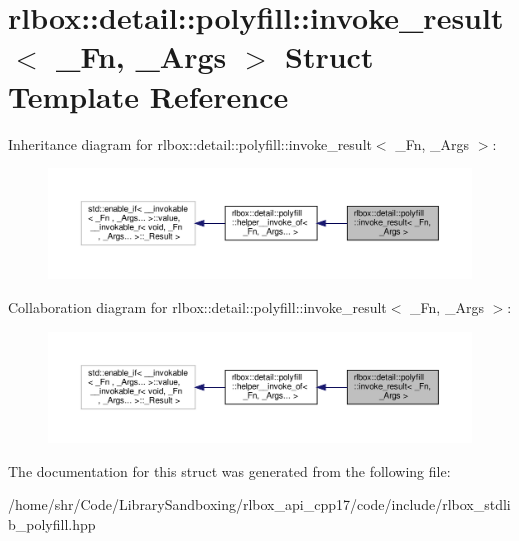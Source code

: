 \hypertarget{structrlbox_1_1detail_1_1polyfill_1_1invoke__result}{}\section{rlbox\+:\+:detail\+:\+:polyfill\+:\+:invoke\+\_\+result$<$ \+\_\+\+Fn, \+\_\+\+Args $>$ Struct Template Reference}
\label{structrlbox_1_1detail_1_1polyfill_1_1invoke__result}


Inheritance diagram for rlbox\+:\+:detail\+:\+:polyfill\+:\+:invoke\+\_\+result$<$ \+\_\+\+Fn, \+\_\+\+Args $>$\+:\nopagebreak
\begin{figure}[H]
\begin{center}
\leavevmode
\includegraphics[width=350pt]{structrlbox_1_1detail_1_1polyfill_1_1invoke__result__inherit__graph}
\end{center}
\end{figure}


Collaboration diagram for rlbox\+:\+:detail\+:\+:polyfill\+:\+:invoke\+\_\+result$<$ \+\_\+\+Fn, \+\_\+\+Args $>$\+:\nopagebreak
\begin{figure}[H]
\begin{center}
\leavevmode
\includegraphics[width=350pt]{structrlbox_1_1detail_1_1polyfill_1_1invoke__result__coll__graph}
\end{center}
\end{figure}


The documentation for this struct was generated from the following file\+:\begin{DoxyCompactItemize}
\item 
/home/shr/\+Code/\+Library\+Sandboxing/rlbox\+\_\+api\+\_\+cpp17/code/include/rlbox\+\_\+stdlib\+\_\+polyfill.\+hpp\end{DoxyCompactItemize}
